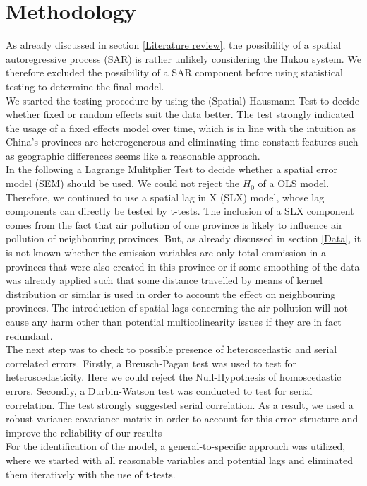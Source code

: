 \documentclass[]{article}
\begin{document}
\section{Methodology}
As already discussed in section \ref{Literature review}, the possibility of a spatial autoregressive process (SAR) is rather unlikely considering the Hukou system. We therefore excluded the possibility of a SAR component before using statistical testing to determine the final model.\\
We started the testing procedure by using the (Spatial) Hausmann Test to decide whether fixed or random effects suit the data better. The test strongly indicated the usage of a fixed effects model over time, which is in line with the intuition as China's provinces are heterogenerous and eliminating time constant features such as geographic differences seems like a reasonable approach.\\
In the following a Lagrange Mulitplier Test to decide whether a spatial error model (SEM) should be used. We could not reject the $H_0$ of a OLS model. Therefore, we continued to use a spatial lag in X (SLX) model, whose lag components can directly be tested by t-tests. The inclusion of a SLX component comes from the fact that air pollution of one province is likely to influence air pollution of neighbouring provinces. But, as already discussed in section \ref{Data}, it is not known whether the emission variables are only total emmission in a provinces that were also created in this province or if some smoothing of the data was already applied such that some distance travelled by means of kernel distribution or similar is used in order to account the effect on neighbouring provinces. The introduction of spatial lags concerning the air pollution will not cause any harm other than potential multicolinearity issues if they are in fact redundant.\\
The next step was to check to possible presence of heteroscedastic and serial correlated errors. Firstly, a Breusch-Pagan test was used to test for heteroscedasticity. Here we could reject the Null-Hypothesis of homoscedastic errors. Secondly, a Durbin-Watson test was conducted to test for serial correlation. The test strongly suggested serial correlation. As a result, we used a robust variance covariance matrix in order to account for this error structure and improve the reliability of our results\\
For the identification of the model, a general-to-specific approach was utilized, where we started with all reasonable variables and potential lags and eliminated them iteratively with the use of t-tests.\\
\end{document}
